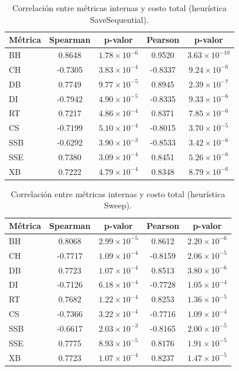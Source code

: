 \begin{table}[H]
\centering
\caption{Correlaci\'on entre m\'etricas internas y costo total (heur\'istica SaveSequential).}
\label{tab:correlacion_savesequential}
\small
\begin{tabular}{@{}lcccc@{}}
\toprule
\textbf{M\'etrica} & \textbf{Spearman} & \textbf{p-valor} & \textbf{Pearson} & \textbf{p-valor} \\
\midrule
BH & 0.8648 & $1.78\times10^{-6}$ & 0.9520 & $3.63\times10^{-10}$ \\
CH & -0.7305 & $3.83\times10^{-4}$ & -0.8337 & $9.24\times10^{-6}$ \\
DB & 0.7749 & $9.77\times10^{-5}$ & 0.8945 & $2.39\times10^{-7}$ \\
DI & -0.7942 & $4.90\times10^{-5}$ & -0.8335 & $9.33\times10^{-6}$ \\
RT & 0.7217 & $4.86\times10^{-4}$ & 0.8371 & $7.85\times10^{-6}$ \\
CS & -0.7199 & $5.10\times10^{-4}$ & -0.8015 & $3.70\times10^{-5}$ \\
SSB & -0.6292 & $3.90\times10^{-3}$ & -0.8533 & $3.42\times10^{-6}$ \\
SSE & 0.7380 & $3.09\times10^{-4}$ & 0.8451 & $5.26\times10^{-6}$ \\
XB & 0.7222 & $4.79\times10^{-4}$ & 0.8348 & $8.79\times10^{-6}$ \\
\bottomrule
\end{tabular}
\end{table}

\begin{table}[H]
\centering
\caption{Correlaci\'on entre m\'etricas internas y costo total (heur\'istica Sweep).}
\label{tab:correlacion_sweep}
\small
\begin{tabular}{@{}lcccc@{}}
\toprule
\textbf{M\'etrica} & \textbf{Spearman} & \textbf{p-valor} & \textbf{Pearson} & \textbf{p-valor} \\
\midrule
BH & 0.8068 & $2.99\times10^{-5}$ & 0.8612 & $2.20\times10^{-6}$ \\
CH & -0.7717 & $1.09\times10^{-4}$ & -0.8159 & $2.06\times10^{-5}$ \\
DB & 0.7723 & $1.07\times10^{-4}$ & 0.8513 & $3.80\times10^{-6}$ \\
DI & -0.7126 & $6.18\times10^{-4}$ & -0.7728 & $1.05\times10^{-4}$ \\
RT & 0.7682 & $1.22\times10^{-4}$ & 0.8253 & $1.36\times10^{-5}$ \\
CS & -0.7366 & $3.22\times10^{-4}$ & -0.7716 & $1.09\times10^{-4}$ \\
SSB & -0.6617 & $2.03\times10^{-3}$ & -0.8165 & $2.00\times10^{-5}$ \\
SSE & 0.7775 & $8.93\times10^{-5}$ & 0.8176 & $1.91\times10^{-5}$ \\
XB & 0.7723 & $1.07\times10^{-4}$ & 0.8237 & $1.47\times10^{-5}$ \\
\bottomrule
\end{tabular}
\end{table}

